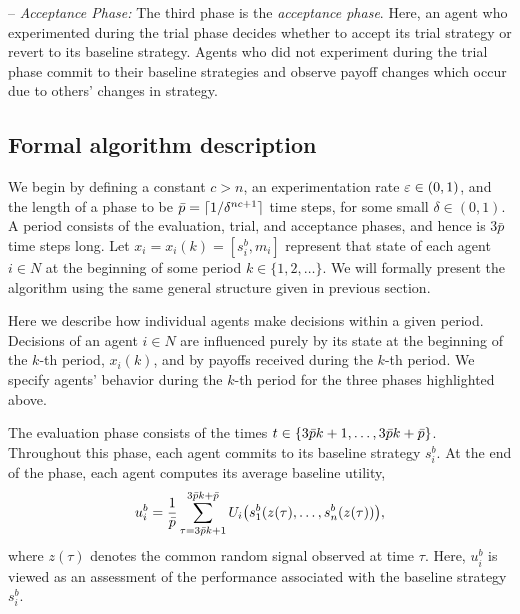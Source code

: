 \vspace{.1cm}
%
\noindent -- {\it Acceptance Phase:} The third phase is the {\it acceptance phase}. Here, an agent who experimented during the trial phase decides whether to accept its trial strategy or revert to its baseline strategy. Agents who did not experiment during the trial phase commit to their baseline strategies and observe payoff changes which occur due to others' changes in strategy.  


\subsection{Formal algorithm description}\label{s:algorithm}


We begin by defining a constant $c > n$, an experimentation rate $\varepsilon\in (0,1)$, and the length of a phase to be $\bar{p} = \lceil 1/\delta^{nc+1}\rceil$ time steps, for some small $\delta\in (0,1)$. A period consists of the evaluation, trial, and acceptance phases, and hence is $3\bar{p}$ time steps long. Let $x_i = x_i(k) = [s_i^b, m_i]$ represent that state of each agent $i \in N$ at the beginning of some period $k \in \{1, 2, \dots\}$.  We will formally present the algorithm using the same general structure given in previous section.  

\vspace{.2cm}

  Here we describe how individual agents make decisions within a given period.  Decisions of an agent $i \in N$ are influenced purely by its state at the beginning of the $k$-th period, $x_i(k)$, and by payoffs received during the $k$-th period.  We specify agents' behavior during the $k$-th period for the three phases highlighted above.   



\vspace{.2cm}
%
 The evaluation phase consists of the times $t \in \{3\bar{p} k + 1, \dots, 3\bar{p} k+\bar{p}\}$.  Throughout this phase, each agent commits to its baseline strategy $s_i^b$.  At the end of the phase, each agent computes its average baseline utility, 
%
\begin{equation}\label{e:baseline payoff}
u_i^b = {1\over \bar{p}}\sum_{\tau = 3 \bar{p} k+1}^{3\bar{p} k+\bar{p}}U_i\bigl(s_1^b(z(\tau), \dots, s_n^b(z(\tau))  \bigr),
\end{equation}
%
where $z(\tau)$ denotes the common random signal observed at time $\tau$.  Here, $u_i^b$ is viewed as an assessment of the performance associated with the baseline strategy $s_i^b$.  


